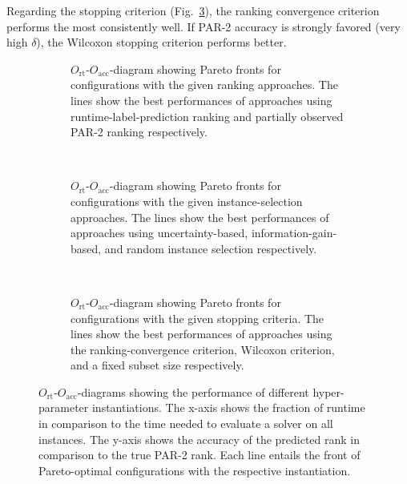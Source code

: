 \documentclass[runningheads]{llncs}
\begin{document}
Regarding the stopping criterion (Fig.~\ref{fig:annitraincolorstopping}), the ranking convergence criterion performs the most consistently well.
If PAR-2 accuracy is strongly favored (very high $\delta$), the Wilcoxon stopping criterion performs better.

\begin{figure}[tbp!]
  \centering
  \begin{subfigure}{1.0\textwidth}
    \caption{
    	$O_{\operatorname{rt}}$-$O_{\operatorname{acc}}$-diagram showing Pareto fronts for configurations with the given ranking approaches.
    	The lines show the best performances of approaches using runtime-label-prediction ranking and partially observed PAR-2 ranking respectively.
    }
    \label{fig:annitraincolorranking}
  \end{subfigure}
  \\
  \vspace{0.2cm}
  \begin{subfigure}{1.0\textwidth}
    \caption{
    	$O_{\operatorname{rt}}$-$O_{\operatorname{acc}}$-diagram showing Pareto fronts for configurations with the given instance-selection approaches.
    	The lines show the best performances of approaches using uncertainty-based, information-gain-based, and random instance selection respectively.
    }
    \label{fig:annitraincolorselection}
  \end{subfigure}
  \\
  \vspace{0.2cm}
  \begin{subfigure}{1.0\textwidth}
    \caption{
    	$O_{\operatorname{rt}}$-$O_{\operatorname{acc}}$-diagram showing Pareto fronts for configurations with the given stopping criteria.
    	The lines show the best performances of approaches using the ranking-convergence criterion, Wilcoxon criterion, and a fixed subset size respectively.
    }
    \label{fig:annitraincolorstopping}
  \end{subfigure}

  \caption{
  	$O_{\operatorname{rt}}$-$O_{\operatorname{acc}}$-diagrams showing the performance of different hyper-parameter instantiations.
  	The x-axis shows the fraction of runtime in comparison to the time needed to evaluate a solver on all instances.
  	The y-axis shows the accuracy of the predicted rank in comparison to the true PAR-2 rank.
  	Each line entails the front of Pareto-optimal configurations with the respective instantiation.
  }
  \label{fig:e2eallsolvers}
\end{figure}
\end{document}
